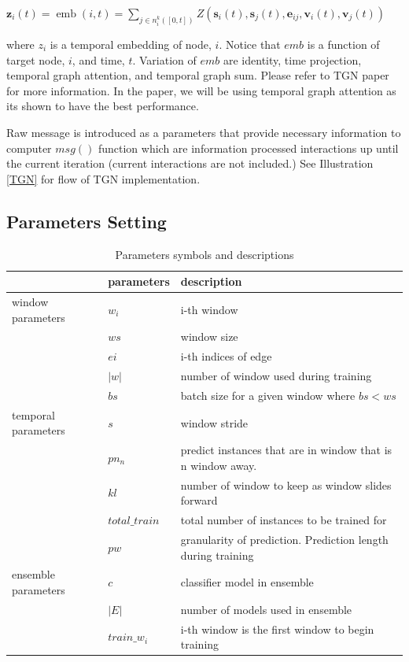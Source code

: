 \documentclass{IEEEtran}
\begin{document}
\(\mathbf{z}_{i}(t)=\operatorname{emb}(i, t)=\sum_{j \in n_{i}^{k}([0, t])} Z\left(\mathbf{s}_{i}(t), \mathbf{s}_{j}(t), \mathbf{e}_{i j}, \mathbf{v}_{i}(t), \mathbf{v}_{j}(t)\right)\)

where \(z_{i}\) is a temporal embedding of node, \(i\). Notice that \(emb\) is a function of target node, \(i\), and time, \(t\). Variation of \(emb\) are identity, time projection, temporal graph attention, and temporal graph sum. Please refer to TGN paper \cite{rossi2020temporal} for more information. In the paper, we will be using temporal graph attention as its shown to have the best performance.

Raw message is introduced as a parameters that provide necessary information to computer \(msg()\) function which are information processed interactions up until the current iteration (current interactions are not included.) See Illustration \ref{TGN} for flow of TGN implementation.
\subsection{Parameters Setting}
\label{sec:orgd6aace9}
\begin{table}[htbp]
\caption{\label{parameters}Parameters symbols and descriptions}
\centering
\begin{tabular}{lll}
\hline
\hline
 & parameters & description\\
\hline
window parameters & \(w_i\) & i-th window\\
 & \(ws\) & window size\\
 & \(ei\) & i-th indices of edge\\
 & \(\vert w \vert\) & number of window used during training\\
 & \(bs\) & batch size for a given window where \(bs < ws\)\\
temporal parameters & \(s\) & window stride\\
 & \(pn_{n}\) & predict instances that are in window that is n window away.\\
 & \(kl\) & number of window to keep as window slides forward\\
 & \(total\_train\) & total number of instances to be trained for\\
 & \(pw\) & granularity of prediction. Prediction length during training\\
ensemble parameters & \(c\) & classifier model in ensemble\\
 & \(\vert E \vert\) & number of models used in ensemble\\
 & \(train\_w_{i}\) & i-th window is the first window to begin training\\
\end{tabular}
\end{table}
\end{document}
